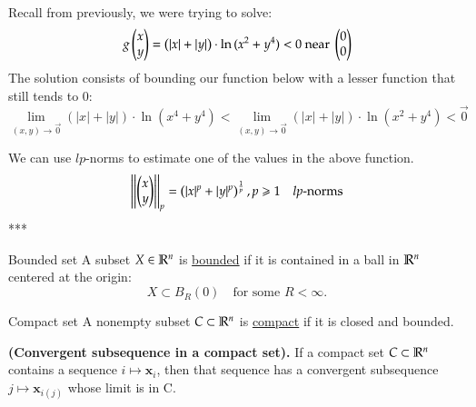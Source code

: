\\

Recall from previously, we were trying to solve:
\[g\begin{pmatrix} x \\ y \end{pmatrix}= \left( |x|+|y| \right)\cdot \ln{(x^2+y^4)}<0 \text{ near }\begin{pmatrix} 0 \\ 0 \end{pmatrix}\]
The solution consists of bounding our function below with a lesser function that still tends to 0: 
\[\lim_{(x,y)\to \vec{0}}(|x|+|y|)\cdot \ln{(x^4+y^4)}<\lim_{(x,y)\to \vec{0}}(|x|+|y|)\cdot \ln{(x^2+y^4)}<\vec{0}\]

We can use $lp$-norms to estimate one of the values in the above function.
\[\left|\left| \begin{pmatrix} x \\ y \end{pmatrix}\right|\right|_p=\left(|x|^p + |y|^p\right)^{\frac{1}{p}}, p\geqslant 1\quad lp\text{-norms}\]
***

\iffalse
\[(x^4+y^4)^{\frac{1}{4}}\cdot \ln{(x^4+y^4)}<(|x|+|y|)\cdot \ln{(x^4+y^4)}<g\Point{x \\ y}<0\]
We can then rewrite the new function as
\[f\Point{x \\ y}=f(x^2+y^2)=f(u)=u^{\frac{1}{4}}\cdot \ln{(u)}\]
\[\lim_{u\rightarrow 0} f(u)=\lim_{u\rightarrow 0} u^{\frac{1}{4}}\cdot \ln{(u)}=\lim_{u\rightarrow 0} \frac{\ln{(u)}}{u^{-\frac{1}{4}}}=\lim_{u\rightarrow 0} \frac{(\ln{(u)})'}{(u^{-\frac{1}{4}})'}=\lim_{u\rightarrow 0} \frac{u^{-1}}{\frac{1}{4}u^{5/4}}\] \fi


\begin{defn}{Bounded set}
A subset $X\in \mathbb{R}^n$ is \ul{bounded} if it is contained in a ball in $\mathbb{R}^n$ centered at the origin:
  \[X\subset B_R(0)\quad \text{for some }R<\infty.\]
\end{defn}

\begin{defn}{Compact set}
A nonempty subset $C\subset \mathbb{R}^n$ is \ul{compact} if it is closed and bounded.
\end{defn}

\begin{theorem}
  \textbf{(Convergent subsequence in a compact set).} If a compact set $C\subset \mathbb{R}^n$ contains a sequence $i\mapsto \bm{x}_i$, then that sequence has a convergent subsequence $j\mapsto \bm{x}_{i(j)}$ whose limit is in C.
\end{theorem}
